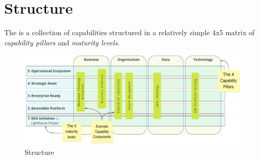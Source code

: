 \chapter{Structure}\label{ch:ekg-mm-structure}

The  is a collection of capabilities structured in a relatively simple 4x5 matrix of
\textit{capability pillars} and \textit{maturity levels}.

\begin{figure}[ht]
    \centering
    \includegraphics[width=\textwidth]{../images/ekg-mm-structure.pdf}
    \caption{ Structure}
    \label{fig:ekg-mm-structure}
\end{figure}













